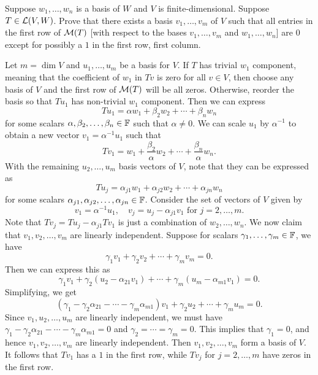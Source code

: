 \begin{exercise}
Suppose $w_1,\dots,w_n$ is a basis of $W$ and $V$ is finite-dimensional.
Suppose $T\in\mathcal{L}(V,W)$. Prove that there exists a basis $v_1,\dots,v_m$ of $V$
such that all entries in the first row of $\mathcal{M}(T)$ [with respect to the bases
$v_1,\dots,v_m$ and $w_1,\dots,w_n$] are $0$ except for possibly a $1$ in the
first row, first column.
\end{exercise}
\begin{solution}
Let $m=\dim V$ and $u_1,\dots,u_m$ be a basis for $V$. If $T$ has trivial $w_1$
component, meaning that the coefficient of $w_1$ in $Tv$ is zero for all
$v\in V$, then choose any basis of $V$ and the first row of $\mathcal{M}(T)$ will be
all zeros. Otherwise, reorder the basis so that $Tu_1$ has non-trivial $w_1$
component. Then we can express
\[ Tu_1 = \alpha w_1+\beta_2w_2+\cdots+\beta_nw_n \]
for some scalars $\alpha,\beta_2,\dots,\beta_n\in\mathbb{F}$ such that $\alpha\ne0$. We
can scale $u_1$ by $\alpha^{-1}$ to obtain a new vector $v_1=\alpha^{-1}u_1$
such that
\[ Tv_1 = w_1+\frac{\beta_2}{\alpha}w_2+\cdots+\frac{\beta_n}{\alpha}w_n. \]
With the remaining $u_2,\dots,u_m$ basis vectors of $V$, note that they can be
expressed as
\[ Tu_j = \alpha_{j1}w_1+\alpha_{j2}w_2+\cdots+\alpha_{jn}w_n \]
for some scalars $\alpha_{j1},\alpha_{j2},\dots,\alpha_{jn}\in\mathbb{F}$. Consider the
set of vectors of $V$ given by
\[ v_1 = \alpha^{-1}u_1, \quad v_j = u_j-\alpha_{j1}v_1 \text{ for }
   j=2,\dots,m. \]
Note that $Tv_j=Tu_j-\alpha_{j1}Tv_1$ is just a combination of
$w_2,\dots,w_n$. We now claim that $v_1,v_2,\dots,v_m$ are linearly
independent. Suppose for scalars $\gamma_1,\dots,\gamma_m\in\mathbb{F}$, we have
\[ \gamma_1v_1+\gamma_2v_2+\cdots+\gamma_mv_m = 0. \]
Then we can express this as
\[ \gamma_1v_1+\gamma_2(u_2-\alpha_{21}v_1)+\cdots+\gamma_m(u_m-\alpha_{m1}v_1)
   = 0. \]
Simplifying, we get
\[ (\gamma_1-\gamma_2\alpha_{21}-\cdots-\gamma_m\alpha_{m1})v_1
   +\gamma_2u_2+\cdots+\gamma_mu_m = 0. \]
Since $v_1,u_2,\dots,u_m$ are linearly independent, we must have
$\gamma_1-\gamma_2\alpha_{21}-\cdots-\gamma_m\alpha_{m1}=0$ and
$\gamma_2=\cdots=\gamma_m=0$. This implies that $\gamma_1=0$, and hence
$v_1,v_2,\dots,v_m$ are linearly independent. Then $v_1,v_2,\dots,v_m$ form a
basis of $V$. It follows that $Tv_1$ has a $1$ in the first row, while $Tv_j$
for $j=2,\dots,m$ have zeros in the first row.
\end{solution}

